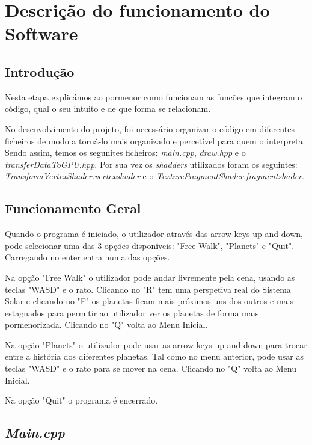 \chapter{Descrição do funcionamento do Software}
\label{chap:imp-test}

\section{Introdução}
\label{chap4:sec:intro}
Nesta etapa explicámos ao pormenor como funcionam as funcões que integram o código, qual o seu intuito e de que forma se relacionam.

No desenvolvimento do projeto, foi necessário organizar o código em diferentes ficheiros de modo a torná-lo mais organizado e percetível para quem o interpreta.
Sendo assim, temos os segunites ficheiros: \textit{main.cpp}, \textit{draw.hpp} e o  \textit{transferDataToGPU.hpp}. Por sua vez os \textit{shadders} utilizados foram os seguintes: \textit{TransformVertexShader.vertexshader} e o  \textit{TextureFragmentShader.fragmentshader}.

\section{Funcionamento Geral}
Quando o programa é iniciado, o utilizador através das arrow keys up and down, pode selecionar uma das 3 opções disponíveis: "Free Walk", "Planets" e "Quit". Carregando no enter entra numa das opções.

Na opção "Free Walk" o utilizador pode andar livremente pela cena, usando as teclas "WASD" e o rato. Clicando no "R" tem uma perspetiva real do Sistema Solar e clicando no "F" os planetas ficam mais próximos uns dos outros e mais estagnados para permitir ao utilizador ver os planetas de forma mais pormenorizada. Clicando no "Q" volta ao Menu Inicial.

Na opção "Planets" o utilizador pode usar as arrow keys up and down para trocar entre a história dos diferentes planetas. Tal como no menu anterior, pode usar as teclas "WASD" e o rato para se mover na cena. Clicando no "Q" volta ao Menu Inicial.

Na opção "Quit" o programa é encerrado.

\section{\textit{Main.cpp}}
\label{chap4:sec:...}


